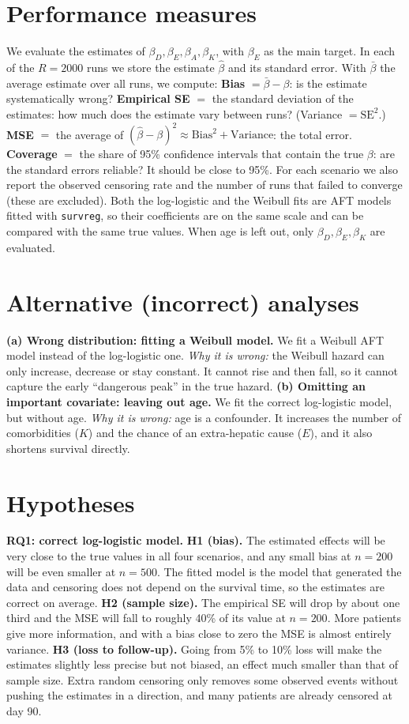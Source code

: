 \documentclass[10pt,a4paper]{article}
\begin{document}
\section{Performance measures}
We evaluate the estimates of $\beta_D,\beta_E,\beta_A,\beta_K$, with $\beta_E$ as the main target. In each of the $R=2000$ runs we store the estimate $\hat\beta$ and its standard error. With $\bar\beta$ the average estimate over all runs, we compute:
\textbf{Bias} $=\bar\beta-\beta$: is the estimate systematically wrong?
\textbf{Empirical SE} $=$ the standard deviation of the estimates: how much does the estimate vary between runs? (Variance $=\mathrm{SE}^2$.)
\textbf{MSE} $=$ the average of $(\hat\beta-\beta)^2\approx\mathrm{Bias}^2+\mathrm{Variance}$: the total error.
\textbf{Coverage} $=$ the share of 95\% confidence intervals that contain the true $\beta$: are the standard errors reliable? It should be close to 95\%.
For each scenario we also report the observed censoring rate and the number of runs that failed to converge (these are excluded). Both the log-logistic and the Weibull fits are AFT models fitted with \texttt{survreg}, so their coefficients are on the same scale and can be compared with the same true values. When age is left out, only $\beta_D,\beta_E,\beta_K$ are evaluated.

\section{Alternative (incorrect) analyses}
\textbf{(a) Wrong distribution: fitting a Weibull model.} We fit a Weibull AFT model instead of the log-logistic one. \emph{Why it is wrong:} the Weibull hazard can only increase, decrease or stay constant. It cannot rise and then fall, so it cannot capture the early ``dangerous peak'' in the true hazard.
\textbf{(b) Omitting an important covariate: leaving out age.} We fit the correct log-logistic model, but without age. \emph{Why it is wrong:} age is a confounder. It increases the number of comorbidities ($K$) and the chance of an extra-hepatic cause ($E$), and it also shortens survival directly.

\section{Hypotheses}
\textbf{RQ1: correct log-logistic model.}
\textbf{H1 (bias).} The estimated effects will be very close to the true values in all four scenarios, and any small bias at $n=200$ will be even smaller at $n=500$. The fitted model is the model that generated the data and censoring does not depend on the survival time, so the estimates are correct on average.
\textbf{H2 (sample size).} The empirical SE will drop by about one third and the MSE will fall to roughly 40\% of its value at $n=200$. More patients give more information, and with a bias close to zero the MSE is almost entirely variance.
\textbf{H3 (loss to follow-up).} Going from 5\% to 10\% loss will make the estimates slightly less precise but not biased, an effect much smaller than that of sample size. Extra random censoring only removes some observed events without pushing the estimates in a direction, and many patients are already censored at day 90.
\end{document}
